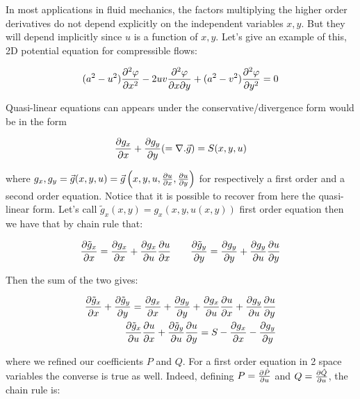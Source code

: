 In most applications in fluid mechanics, the factors multiplying the higher order derivatives do not depend explicitly on the independent variables $x,y$. But they will depend implicitly since $u$ is a function of $x,y$. Let's give an example of this, 2D potential equation for compressible flows: 

\begin{equation}
(a^2 - u^2)\frac{\partial^2\varphi}{\partial x^2} - 2uv \frac{\partial ^2 \varphi}{\partial x \partial y} + (a^2 - v^2) \frac{\partial ^2 \varphi}{\partial y^2} = 0
\end{equation}

Quasi-linear equations can appears under the conservative/divergence form would be in the form 

\begin{equation}
\frac{\partial g_x}{\partial x} + \frac{\partial g_y}{\partial y} (=\nabla .\vec{g}) = S(x,y,u)
\end{equation}

where $g_x, g_y = \vec{g}(x,y,u) = \vec{g}\left(x,y,u,\frac{\partial u}{\partial x}, \frac{\partial u}{\partial y}\right)$ for respectively a first order and a second order equation. Notice that it is possible to recover from here the quasi-linear form. Let's call $\tilde{g}_x (x,y) = g_x(x,y,u(x,y))$ first order equation then we have that by chain rule that: 

\begin{equation}
\frac{\partial \tilde{g}_x}{\partial x} = \frac{\partial g_x}{\partial x}  +\frac{\partial g_x }{\partial u}\frac{\partial u}{\partial x} \qquad \frac{\partial \tilde{g}_y}{\partial y} = \frac{\partial g_y}{\partial y}  +\frac{\partial g_y }{\partial u}\frac{\partial u}{\partial y}
\end{equation}

Then the sum of the two gives: 

\begin{equation}
\begin{aligned}
\frac{\partial \tilde{g}_x}{\partial x} + \frac{\partial \tilde{g}_y}{\partial y} = \frac{\partial g_x}{\partial x} + \frac{\partial g_y}{\partial y}  +\frac{\partial g_x }{\partial u}\frac{\partial u}{\partial x} +\frac{\partial g_y }{\partial u}\frac{\partial u}{\partial y}  \\
\frac{\partial \tilde{g} _x}{\partial u} \frac{\partial u}{\partial x} + \frac{\partial \tilde{g}_y}{\partial u} \frac{\partial u}{\partial y} = S - \frac{\partial g_x}{\partial x} - \frac{\partial g_y}{\partial y}
\end{aligned}
\end{equation}

where we refined our coefficients $P$ and $Q$. For a first order equation in 2 space variables the converse is true as well. Indeed, defining $P= \frac{\partial \hat{P}}{\partial u}$ and $Q= \frac{\partial \hat{Q}}{\partial u}$, the chain rule is: 

